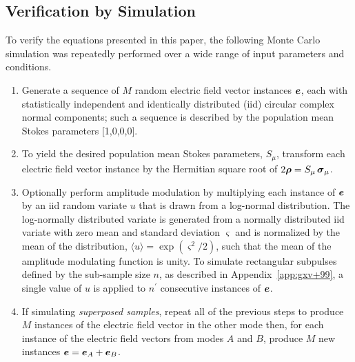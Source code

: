 \documentclass[twocolumn]{aastex6}
\newcommand{\mbf}[1]{\mbox{\boldmath $#1$}}
\newcommand{\App}[1]{Appendix~\ref{app:#1}}
\newcommand{\irow}{\mu} \newcommand{\icol}{\nu}
\newcommand{\pauli}[1]{\ensuremath{\mbf{\sigma}_{#1}}}
\begin{document}
{\begin{appendix}
%
%



\section{Verification by Simulation}
\label{app:simulations}

To verify the equations presented in this paper, the following Monte
Carlo simulation was repeatedly performed over a wide range of input
parameters and conditions.

\begin{enumerate}
\item Generate a sequence of $M$ random electric field vector
  instances $\mbf{e}$, each with statistically independent and
  identically distributed (iid) circular complex normal components;
  such a sequence is described by the population mean Stokes
  parameters [1,0,0,0].
  
\item To yield the desired population mean Stokes parameters, $S_\irow$,
  transform each electric field vector instance by the Hermitian square
  root of $2\mbf\rho=S_\irow\,\pauli{\irow}$.

\item Optionally perform amplitude modulation by multiplying each
  instance of $\mbf{e}$ by an iid random variate $u$ that is drawn
  from a log-normal distribution.  The log-normally distributed
  variate is generated from a normally distributed iid variate with
  zero mean and standard deviation $\varsigma$ and is normalized by
  the mean of the distribution, $\langle u \rangle =
  \exp(\varsigma^2/2)$, such that the mean of the amplitude modulating
  function is unity.
  To simulate rectangular subpulses defined by the sub-sample size $n$, as
  described in \App{gxv+99}, a single value of $u$ is applied to $n^\prime$
  consecutive instances of $\mbf{e}$.

\item If simulating \emph{superposed samples}, repeat all of the previous
  steps to produce $M$ instances of the electric field vector in the
  other mode then, for each instance of the electric field vectors
  from modes $A$ and $B$, produce $M$ new instances
  $\mbf{e}=\mbf{e}_A+\mbf{e}_B$.
  

\end{enumerate}
\end{appendix}}
\end{document}
